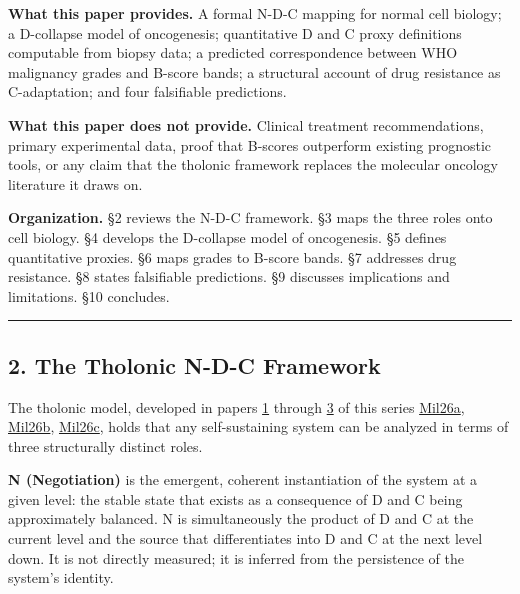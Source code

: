 \documentclass[
  11pt,
  letterpaper,
]{article}
\begin{document}
\textbf{What this paper provides.} A formal N-D-C mapping for normal
cell biology; a D-collapse model of oncogenesis; quantitative D and C
proxy definitions computable from biopsy data; a predicted
correspondence between WHO malignancy grades and B-score bands; a
structural account of drug resistance as C-adaptation; and four
falsifiable predictions.

\textbf{What this paper does not provide.} Clinical treatment
recommendations, primary experimental data, proof that B-scores
outperform existing prognostic tools, or any claim that the tholonic
framework replaces the molecular oncology literature it draws on.

\textbf{Organization.} §2 reviews the N-D-C framework. §3 maps the three
roles onto cell biology. §4 develops the D-collapse model of
oncogenesis. §5 defines quantitative proxies. §6 maps grades to B-score
bands. §7 addresses drug resistance. §8 states falsifiable predictions.
§9 discusses implications and limitations. §10 concludes.

\begin{center}\rule{0.5\linewidth}{0.5pt}\end{center}

\subsection{2. The Tholonic N-D-C
Framework}\label{the-tholonic-n-d-c-framework}

The tholonic model, developed in papers
\href{https://github.com/baardev/truevalue/blob/main/docnav/Research/papers/1_recursive-tholonic-five-constants/1_recursive-tholonic-five-constants.pdf}{1}
through
\href{https://github.com/baardev/truevalue/blob/main/docnav/Research/papers/3_minimal-recursive-triadic-framework/3_minimal-recursive-triadic-framework.pdf}{3}
of this series
\href{https://github.com/baardev/truevalue/blob/main/docnav/Research/papers/1_recursive-tholonic-five-constants/1_recursive-tholonic-five-constants.pdf}{Mil26a},
\href{https://github.com/baardev/truevalue/blob/main/docnav/Research/papers/2_supply-chain-transparency-tvpci/2_supply-chain-transparency-tvpci.pdf}{Mil26b},
\href{https://github.com/baardev/truevalue/blob/main/docnav/Research/papers/3_minimal-recursive-triadic-framework/3_minimal-recursive-triadic-framework.pdf}{Mil26c},
holds that any self-sustaining system can be analyzed in terms of three
structurally distinct roles.

\textbf{N (Negotiation)} is the emergent, coherent instantiation of the
system at a given level: the stable state that exists as a consequence
of D and C being approximately balanced. N is simultaneously the product
of D and C at the current level and the source that differentiates into
D and C at the next level down. It is not directly measured; it is
inferred from the persistence of the system's identity.
\end{document}
